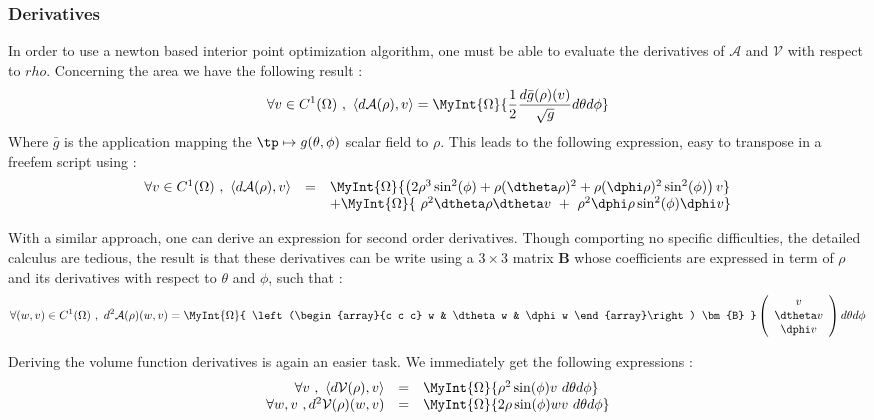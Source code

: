 \documentclass[a4paper,twoside,12pt]{book}
\begin{document}
\subsubsection{Derivatives}
In order to use a newton based interior point optimization algorithm, one must be able to evaluate the derivatives of $\mathcal{A}$ and $\mathcal{V}$ with respect to $rho$. Concerning the area we have the following result :
$$
	\forall v\in C^{1}(\Omega) \ , \ \langle d\mathcal{A}(\rho),v\rangle
	= \MyInt{\Omega}{\frac{1}{2} \frac{ d\bar{g}(\rho)(v)}{\sqrt{g}}d\theta d\phi   }
$$
Where $\bar{g}$ is the application mapping the $\tp \mapsto g(\theta,\phi)$ scalar field to $\rho$. This leads to the following expression, easy to transpose in a freefem script using :
\begin{equation}\label{msdarea}
	\begin{array}{r c l}
		\forall v\in C^{1}(\Omega) \ , \ \langle d\mathcal{A}(\rho),v\rangle &
		=  & \MyInt{\Omega}{  \left(2\rho^{3}\sin^{2}(\phi) + \rho(\dtheta\rho)^{2} + \rho(\dphi\rho)^{2}\sin^{2}(\phi) \right) v} \\
		& &  +\MyInt{\Omega}{\ \rho^{2}\dtheta\rho\dtheta v\ + \ \rho^{2}\dphi\rho\sin^{2}(\phi)\dphi v   }
	\end{array}
\end{equation}

With a similar approach, one can derive an expression for second order derivatives. Though comporting no specific difficulties, the detailed calculus are tedious, the result is that 
these derivatives can be write using a $3\times 3$ matrix $\bm{B}$ whose coefficients are expressed in term of $\rho$ and its derivatives with respect to $\theta$ and $\phi$, such that :
\begin{equation}\label{msd2area}
	\forall (w,v)\in C^{1}(\Omega)\ ,\  d^{2}\mathcal{A}(\rho)(w,v) = \MyInt{\Omega}
	{
		\left(\begin{array}{c c c} w & \dtheta w &  \dphi w \end{array}\right)
		\bm{B}
	}	\left( \begin{array}{c} v \\ \dtheta v \\ \dphi v \end{array} \right) d\theta d\phi
\end{equation}

Deriving the volume function derivatives is again an easier task. We immediately get the following expressions :
\begin{equation}\label{msdvolume}
	\begin{array}{r c l}
		\forall v\ ,\ \langle d\mathcal{V}(\rho),v\rangle & = & \MyInt{\Omega}{\rho^{2}\sin(\phi)v\ d\theta d\phi} \\
		\forall w,v\ , d^{2}\mathcal{V}(\rho)(w,v) & = & \MyInt{\Omega}{2\rho\sin(\phi)wv\ d\theta d\phi}
	\end{array}
\end{equation}
\end{document}
